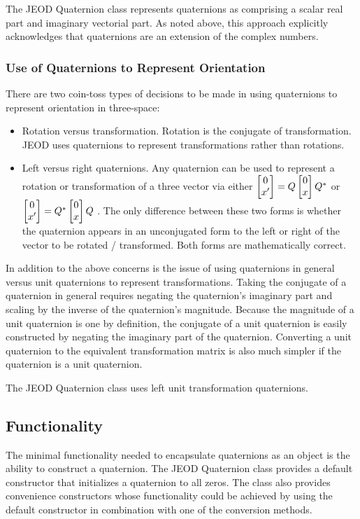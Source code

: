 The JEOD Quaternion class represents quaternions as comprising a  
scalar real part and imaginary vectorial part. As noted above, this approach
explicitly acknowledges that quaternions are an extension of the  
complex numbers.

\subsubsection{Use of Quaternions to Represent Orientation}
There are two coin-toss types of decisions to be made in using  
quaternions to represent orientation in three-space:
\begin{itemize}
\item Rotation versus transformation. Rotation is the conjugate of  
transformation. JEOD uses quaternions to represent transformations  
rather than rotations.
\item Left versus right quaternions.  Any quaternion can be used to  
represent a rotation or transformation of a three vector via either  
$\bmatrix 0 \\ x'\endbmatrix = Q \bmatrix 0 \\ x\endbmatrix Q^{\ast}$ or
$\bmatrix 0 \\ x'\endbmatrix = Q^{\ast} \bmatrix 0 \\ x\endbmatrix Q$ .
The only difference between these two forms is whether the quaternion appears
in an unconjugated form to the left or right of the vector to be rotated /  
transformed. Both forms are mathematically correct.
\end{itemize}

In addition to the above concerns is the issue of using quaternions in  
general versus unit quaternions to represent transformations. Taking  
the conjugate of a quaternion in general requires negating the  
quaternion's imaginary part and scaling by the inverse of the  
quaternion's magnitude. Because the magnitude of a unit quaternion is  
one by definition, the conjugate of a unit quaternion is  
easily constructed by negating the imaginary part of the quaternion.  
Converting a unit quaternion to the equivalent transformation matrix  
is also much simpler if the quaternion is a unit quaternion.

The JEOD Quaternion class uses left unit transformation quaternions.

\subsection{Functionality}
The minimal functionality needed to encapsulate quaternions as an  
object is the ability to construct a quaternion. The JEOD Quaternion  
class provides a default constructor that initializes a quaternion to  
all zeros. The class also provides convenience constructors whose functionality
could be achieved by using the default constructor in combination with  
one of the conversion methods.

